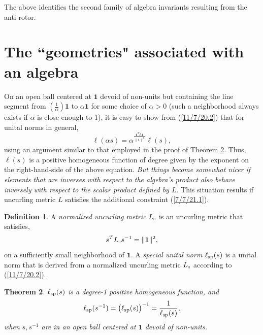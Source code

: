 \documentclass{amsart}
\numberwithin{equation}{section}
\newtheorem{theorem}{Theorem}
\theoremstyle{definition}
\newtheorem{definition}[theorem]{Definition}
\numberwithin{theorem}{section}
\begin{document}
The above identifies the second family of algebra invariants resulting from the anti-rotor.


\section{The ``geometries" associated with an algebra} 
On an open ball centered at $\mathbf{1}$ devoid of non-units but containing the line segment from $\left(\frac{1}{\alpha}\right)\mathbf{1}$ to $\alpha\mathbf{1}$ for some choice of $\alpha>0$ (such a neighborhood always exists if $\alpha$ is close enough to 1), it is easy to show from (\ref{11/7/20.2}) that for unital norms in general,  \[  \ell(\alpha s) = \alpha^{\frac{\mathbf{1}^T L \mathbf{1}}{\|\mathbf{1}\|^2}} \ell(s),\] using an argument similar to that employed in the proof of Theorem \ref{9/24/23.1}. Thus, $ \ell(s)$ is a positive homogeneous function of degree given by the exponent on the right-hand-side of the above equation.  
   {\it But things become somewhat nicer if elements that are inverses with respect to the algebra's product also behave inversely with respect to the scalar product defined by $L$}.  
    This situation results if uncurling metric $L$ satisfies the additional constraint (\ref{7/7/21.1}).

    \begin{definition}\label{9/20/23.1} A {\it normalized uncurling metric} $L_{\shortparallel}$ is an uncurling metric that satisfies, \begin{equation} \label{7/7/21.1} s^TL_{\shortparallel} s^{-1} =\|{\bf 1}\|^2,\end{equation} on a sufficiently small neighborhood of $\mathbf{1}$.   A {\it special unital norm} $\ell_{\rm sp}(s)$ is a unital norm that is derived from a normalized uncurling metric $L_{\shortparallel}$ according to (\ref{11/7/20.2}). 
\end{definition}


\begin{theorem}\label{9/24/23.1} $ \ell_{\rm sp}(s)$ is a degree-1 positive homogeneous function, and
\begin{equation}\label{5/23/23.3}  \ell_{\rm sp}(s^{-1}) = \big(\ell_{\rm sp}(s)\big)^{-1} = \frac{1}{\ell_{\rm sp}(s)}, \end{equation} when $s,s^{-1}$ are in an open ball centered at $\mathbf{1}$ devoid of non-units. \end{theorem}
\end{document}
